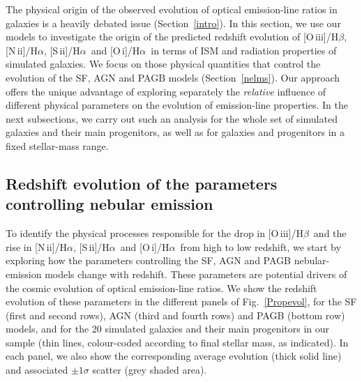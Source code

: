\documentclass[fleqn,usenatbib]{mnras}
\newcommand{\oiiihb}{\hbox{[O\,{\sc iii}]/H$\beta$}}
\newcommand{\niiha}{\hbox{[N\,{\sc ii}]/H$\alpha$}}
\newcommand{\siiha}{\hbox{[S\,{\sc ii}]/H$\alpha$}}
\newcommand{\oiha}{\hbox{[O\,{\sc i}]/H$\alpha$}}
\begin{document}
The physical origin of the observed evolution of optical emission-line
ratios in galaxies is a heavily debated issue (Section~\ref{intro}). 
In this section, we use our models to investigate the origin of
the predicted redshift evolution of \oiiihb, \niiha, \siiha\ and
\oiha\ in terms of ISM and radiation properties of simulated
galaxies. We focus on those physical quantities that control the
evolution of the  SF, AGN and PAGB models (Section~\ref{nelms}). Our
approach offers  the unique advantage of exploring separately the {\it
  relative} influence  of different physical parameters on the
evolution of emission-line properties.  In the next subsections, we
carry out such an analysis for the whole set of simulated galaxies and
their main progenitors, as well as for galaxies and progenitors in a
fixed stellar-mass range.  

\subsection{Redshift evolution of the parameters controlling nebular emission}\label{zevolparam}

To identify the physical processes responsible for the drop in
\oiiihb\ and the rise in \niiha, \siiha\ and \oiha\ from high to low
redshift, we start by exploring how the parameters controlling the SF,
AGN and PAGB nebular-emission models  change with redshift. These
parameters are potential drivers of the cosmic evolution  of optical
emission-line ratios. We show the redshift evolution of these
parameters  in the different panels of Fig.~\ref{Propevol}, for the SF
(first and second rows), AGN  (third and fourth rows) and PAGB (bottom
row) models, and for the 20 simulated galaxies  and their main
progenitors in our sample (thin lines, colour-coded according to final
stellar  mass, as indicated). In each panel, we also show the
corresponding average evolution  (thick solid line) and associated
$\pm1\sigma$ scatter (grey shaded area). 
\end{document}
